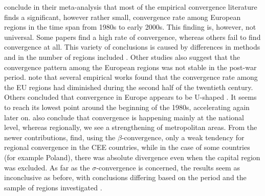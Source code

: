 \documentclass[11pt]{article}
\begin{document}
\citet{eckey2007convergence} conclude in their meta-analysis that most of the empirical convergence literature finds a significant, however rather small, convergence rate among European regions in the time span from 1980s to early 2000s. This finding is, however, not universal. Some papers find a high rate of convergence, whereas others fail to find convergence at all. This variety of conclusions is caused by differences in methods and in the number of regions included \citep{eckey2007convergence}. Other studies also suggest that the convergence pattern among the European regions was not stable in the post-war period. \citet{eckey2007convergence} note that several empirical works found that the convergence rate among the EU regions had diminished during the second half of the twentieth century. Others concluded that convergence in Europe appears to be U-shaped \citep{basile2001regional, geppert2008regional}. It seems to reach its lowest point around the beginning of the 1980s, accelerating again later on. \citet{geppert2008regional} also conclude that convergence is happening mainly at the national level, whereas regionally, we see a strengthening of metropolitan areas. From the newer contributions, \citet*{sme2012regional} find, using the $\beta$-convergence, only a weak tendency for regional convergence in the CEE countries, while in the case of some countries (for example Poland), there was absolute divergence even when the capital region was excluded. As far as the $\sigma$-convergence is concerned, the results seem as inconclusive as before, with conclusions differing based on the period and the sample of regions investigated \citep{eckey2007convergence}.
 
\end{document}
